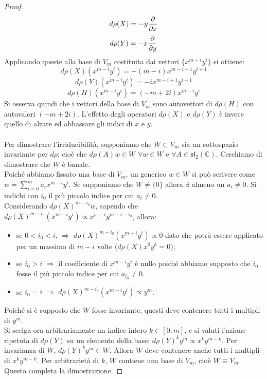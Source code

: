 \documentclass[12pt,a4paper]{report}
\theoremstyle{definition}
\theoremstyle{definition}
\theoremstyle{definition}
\theoremstyle{remark}
\begin{document}
\begin{proof}
	\begin{equation*}
	d\rho(X)=-y{\partial\over\partial x}
\end{equation*}
	\begin{equation*}
	d\rho(Y)=-x{\partial\over\partial y}
\end{equation*}
	Applicando queste alla base di $V_m$ costituita dai vettori $\{x^{m-i}y^i\}$ si ottiene:
	$$d\rho(X)(x^{m-i}y^i)=-(m-i)x^{m-i-1}y^{i+1}$$
	$$d\rho(Y)(x^{m-i}y^i)=-ix^{m-i+1}y^{i-1}$$
	$$d\rho(H)(x^{m-i}y^i)=(-m+2i)x^{m-i}y^i$$
	Si osserva quindi che i vettori della base di $V_m$ sono autovettori di $d\rho(H)$ con autovalori $(-m+2i)$. L'effetto degli operatori $d\rho(X)$ e $d\rho(Y)$ è invece quello di alzare ed abbassare gli indici di $x$ e $y$.\\
	\\
	Per dimostrare l'irriducibilità, supponiamo che $W\subset V_m$ sia un sottospazio invariante per $d\rho$; cioè che $d\rho(A)w\in W$ $\forall w\in W$ e $\forall A\in \mathfrak{sl_2(\mathbb{C})}$. Cerchiamo di dimostrare che $W$ è banale. \\Poiché abbiamo fissato una base di $V_m$, un generico $w\in W$ si può scrivere come $w=\sum_{i=0}^{m}a_ix^{m-i}y^i$. Se supponiamo che $W\neq\{0\}$ allora $\exists$ almeno un $a_i\neq 0$.
	Si indichi con $i_0$ il più piccolo indice per cui $a_i\neq 0$. \\
	Considerando $d\rho(X)^{m-i_0}w$, sapendo che $d\rho(X)^{m-i_0}(x^{m-i}y^i)\propto x^{i_0-i}y^{m+i-i_0}$, allora:
	\begin{itemize}
		\item se $0<i_0<i$, $\Rightarrow$ $d\rho(X)^{m-i_0}(x^{m-i}y^i)\propto 0$ dato che potrà essere applicato per un massimo di $m-i$ volte ($d\rho(X)x^0y^k=0$);
		\item se $i_0>i$ $\Rightarrow$ il coefficiente di $x^{m-i}y^{i}$ è nullo poiché abbiamo supposto che $i_0$ fosse il più piccolo indice per cui $a_{i_0}\neq 0$. 
		\item se $i_0=i$ $\Rightarrow$ $d\rho(X)^{m-i_0}(x^{m-i}y^i)\propto y^m$.
	\end{itemize} 
	Poiché si è supposto che $W$ fosse invariante, questi deve contenere tutti i multipli di $y^m$.\\
	Si scelga ora arbitrariamente un indice intero $k\in[0,m]$, e si valuti l'azione ripetuta di $d\rho(Y)$ su un elemento della base: $d\rho(Y)^ky^m\propto x^ky^{m-k}$.
	Per invarianza di $W$, $d\rho(Y)^ky^m\in W$. Allora $W$ deve contenere anche tutti i multipli di $x^ky^{m-k}$. Per arbitrarietà di $k$, $W$ contiene una base di $V_m$, cioè $W\equiv V_m$.\\
	Questo completa la dimostrazione.
\end{proof}
\end{document}
